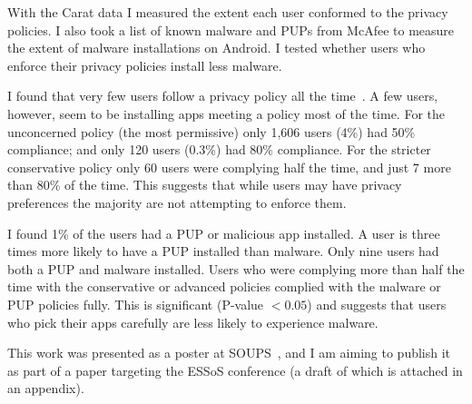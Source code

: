 \documentclass[a4paper]{scrartcl}
\begin{document}
With the Carat data I measured the extent each user conformed to the privacy policies.
I also took a list of known malware and \acp{PUP} from McAfee to measure the extent of malware installations on Android.
I tested whether users who enforce their privacy policies install less malware.

I found that very few users follow a privacy policy all the time~\citep{Hallett:2015ty}.
A few users, however, seem to be installing apps meeting a policy most of the time.
For the unconcerned policy (the most permissive) only 1,606 users (4\%) had 50\% compliance;
and only 120 users (0.3\%) had 80\% compliance.
For the stricter conservative policy only 60 users were complying half the time, and just 7 more than 80\% of the time.
This suggests that while users may have privacy preferences the majority are not attempting to enforce them.

I found 1\% of the users had a PUP or malicious app installed.
A user is three times more likely to have a PUP installed than malware.
Only nine users had both a PUP and malware installed.
Users who were complying more than half the time with the conservative or advanced policies complied with the malware or PUP policies fully.
This is significant (P-value $< 0.05$) and suggests that users who pick their apps carefully are less likely to experience malware.

%
%

This work was presented as a poster at SOUPS~\citep{Hallett:2015ty}, and I am aiming to publish it as part of a paper targeting the ESSoS conference (a draft of which is attached in an appendix).
\end{document}
